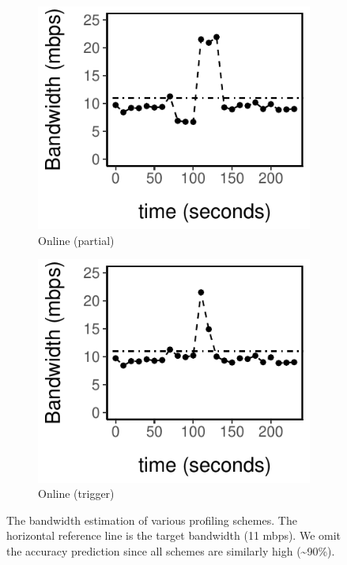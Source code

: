 \begin{figure}
  \\
  \vspace{1.5em}
  \begin{subfigure}[t]{0.48\columnwidth}
    \includegraphics[width=\textwidth]{figures/online3.pdf}
    \caption{Online (partial)}
    \label{fig:online-partial}
  \end{subfigure}
  \hfill
  \begin{subfigure}[t]{0.48\columnwidth}
    \includegraphics[width=\textwidth]{figures/online4.pdf}
    \caption{Online (trigger)}
    \label{fig:online-trigger}
  \end{subfigure}
  \caption{The bandwidth estimation of various profiling schemes. The horizontal
    reference line is the target bandwidth (11 mbps). We omit the accuracy
    prediction since all schemes are similarly high (\textasciitilde 90\%).}
  \label{fig:online-tricks}
\end{figure}

